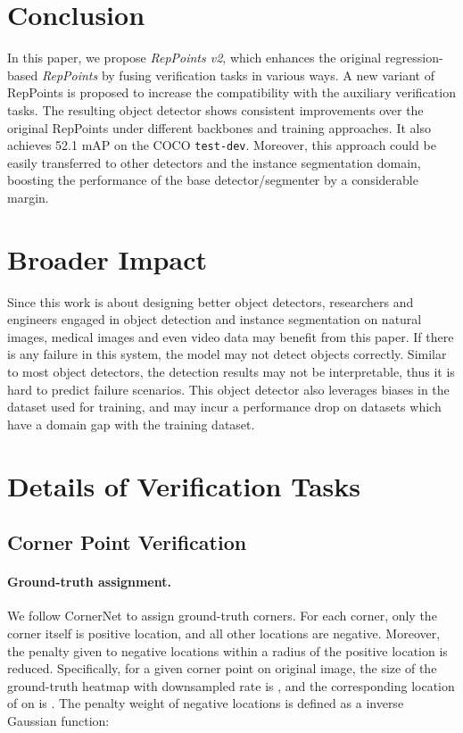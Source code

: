 \documentclass{article}
\begin{document}
\section{Conclusion}
In this paper, we propose \textit{RepPoints v2}, which enhances the original regression-based \textit{RepPoints} by fusing verification tasks in various ways. A new variant of RepPoints is proposed to increase the compatibility with the auxiliary verification tasks. The resulting object detector shows consistent improvements over the original RepPoints under different backbones and training approaches. It also achieves 52.1 mAP on the COCO \texttt{test-dev}. Moreover, this approach could be easily transferred to other detectors and the instance segmentation domain, boosting the performance of the base detector/segmenter by a considerable margin.

\newpage
\section*{Broader Impact}

Since this work is about designing better object detectors, researchers and engineers engaged in object detection and instance segmentation on natural images, medical images and even video data may benefit from this paper. If there is any failure in this system, the model may not detect objects correctly. Similar to most object detectors, the detection results may not be interpretable, thus it is hard to predict failure scenarios. This object detector also leverages biases in the dataset used for training, and may incur a performance drop on datasets which have a domain gap with the training dataset.




\newpage
\appendix

\section{Details of Verification Tasks} \label{sec:verification}

\subsection{Corner Point Verification}

\paragraph{Ground-truth assignment.} We follow CornerNet \cite{CornerNet} to assign ground-truth corners. For each corner, only the corner itself is positive location, and all other locations are negative. Moreover, the penalty given to negative locations within a radius of the positive location is reduced. Specifically, for a given corner point  on original image, the size of the ground-truth heatmap  with  downsampled rate is  , and the corresponding location of  on  is . The penalty weight of negative locations is defined as a inverse Gaussian function:
\end{document}
